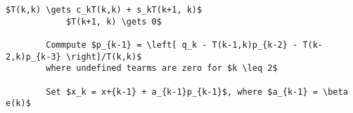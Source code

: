 \begin{lstlisting}[style=algo]
            $T(k,k) \gets c_kT(k,k) + s_kT(k+1, k)$
            $T(k+1, k) \gets 0$

        Commpute $p_{k-1} = \left[ q_k - T(k-1,k)p_{k-2} - T(k-2,k)p_{k-3} \right]/T(k,k)$
        where undefined tearms are zero for $k \leq 2$

        Set $x_k = x+{k-1} + a_{k-1}p_{k-1}$, where $a_{k-1} = \beta e(k)$
\end{lstlisting}